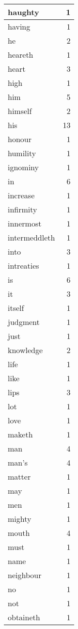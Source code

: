\begin{center}
\begin{longtable}{l|r}
haughty & 1\\ \hline 
having & 1\\ \hline 
he & 2\\ \hline 
heareth & 1\\ \hline 
heart & 3\\ \hline 
high & 1\\ \hline 
him & 5\\ \hline 
himself & 2\\ \hline 
his & 13\\ \hline 
honour & 1\\ \hline 
humility & 1\\ \hline 
ignominy & 1\\ \hline 
in & 6\\ \hline 
increase & 1\\ \hline 
infirmity & 1\\ \hline 
innermost & 1\\ \hline 
intermeddleth & 1\\ \hline 
into & 3\\ \hline 
intreaties & 1\\ \hline 
is & 6\\ \hline 
it & 3\\ \hline 
itself & 1\\ \hline 
judgment & 1\\ \hline 
just & 1\\ \hline 
knowledge & 2\\ \hline 
life & 1\\ \hline 
like & 1\\ \hline 
lips & 3\\ \hline 
lot & 1\\ \hline 
love & 1\\ \hline 
maketh & 1\\ \hline 
man & 4\\ \hline 
man's & 4\\ \hline 
matter & 1\\ \hline 
may & 1\\ \hline 
men & 1\\ \hline 
mighty & 1\\ \hline 
mouth & 4\\ \hline 
must & 1\\ \hline 
name & 1\\ \hline 
neighbour & 1\\ \hline 
no & 1\\ \hline 
not & 1\\ \hline 
obtaineth & 1\\ \hline 

\end{longtable}
\end{center}
